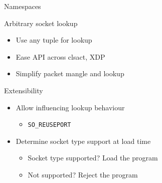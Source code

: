 \documentclass[black,white]{beamer}
\begin{document}
    \begin{frame}[fragile]{Namespaces}
        \vfill
        \centering
        
        \vfill
    \end{frame}

    \begin{frame}{Arbitrary socket lookup}
        \begin{itemize}
            \item Use any tuple for lookup \bigskip
            \item Ease API across clsact, XDP \bigskip
            \item Simplify packet mangle and lookup \bigskip
        \end{itemize}
    \end{frame}

    \begin{frame}[fragile]{Extensibility}
        \begin{itemize}
            \item Allow influencing lookup behaviour \smallskip
            \begin{itemize}
                \item \verb+SO_REUSEPORT+ \bigskip
            \end{itemize}
            \item Determine socket type support at load time \smallskip
            \begin{itemize}
                \item Socket type supported? Load the program \medskip
                \item Not supported? Reject the program \bigskip
            \end{itemize}
        \end{itemize}
    \end{frame}
\end{document}
